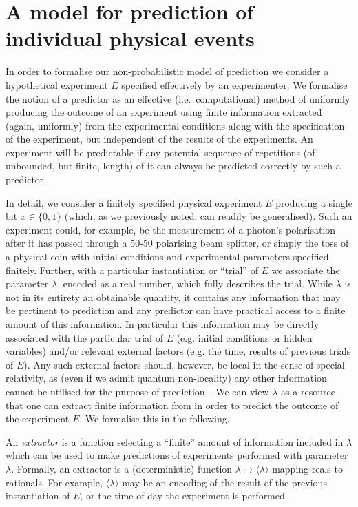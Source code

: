 \documentclass[%
 superscriptaddress,
 preprint,
 showpacs,
 showkeys,
 preprintnumbers,
  amsmath,amssymb,
  aps,
 pra,
  longbibliography,
  floatfix,
 ]{revtex4-1}
\theoremstyle{definition}
\begin{document}
\section{A model for prediction of individual physical events}

In order to formalise our non-probabilistic model of prediction we consider a hypothetical experiment $E$ specified effectively by an experimenter.
We formalise the notion of a predictor as an effective (i.e.\ computational) method of uniformly producing the outcome of an experiment using finite information extracted (again, uniformly) from the experimental conditions along with the specification of the experiment, but independent of the results of the experiments. 
An experiment will be predictable if any potential sequence of repetitions (of unbounded, but finite,  length) of it can always be predicted correctly by such a predictor.

In detail, we consider a finitely specified physical experiment $E$ producing a single bit $x\in\{0,1\}$ (which, as we previously noted, can readily be generalised).
Such an experiment could, for example, be the measurement of a photon's polarisation after it has passed through a 50-50 polarising beam splitter, or simply the toss of a physical coin with initial conditions and experimental parameters specified finitely.
Further, with a particular instantiation or ``trial'' of $E$ we associate the parameter $\lambda$, encoded as a real number,  which fully describes the trial.
While $\lambda$ is not in its entirety an obtainable quantity, it contains any information that may be pertinent to prediction and any predictor can have practical access to a finite amount of this information.
In particular this information may be   directly associated with the particular trial of $E$ (e.g. initial conditions or hidden variables) and/or relevant external factors (e.g. the time, results of previous trials of $E$).
Any such external factors should, however, be local in the sense of special relativity, as (even if we admit quantum non-locality) any other information cannot be utilised for the purpose of prediction~\cite{laloe-2012}.
We can view $\lambda$ as a resource that one can extract finite information from in order   to predict the outcome of the experiment $E$.
We formalise this in the following.

An {\em extractor} is a function selecting a ``finite'' amount of information included in $\lambda$ which can be used to make predictions of experiments performed with parameter $\lambda$. Formally, an extractor is a (deterministic) function $\lambda \mapsto \langle \lambda \rangle$ mapping reals to rationals.
For example, $\langle \lambda \rangle$ may be an encoding of the result of the previous instantiation of $E$, or the time of day the experiment is performed.
\end{document}
